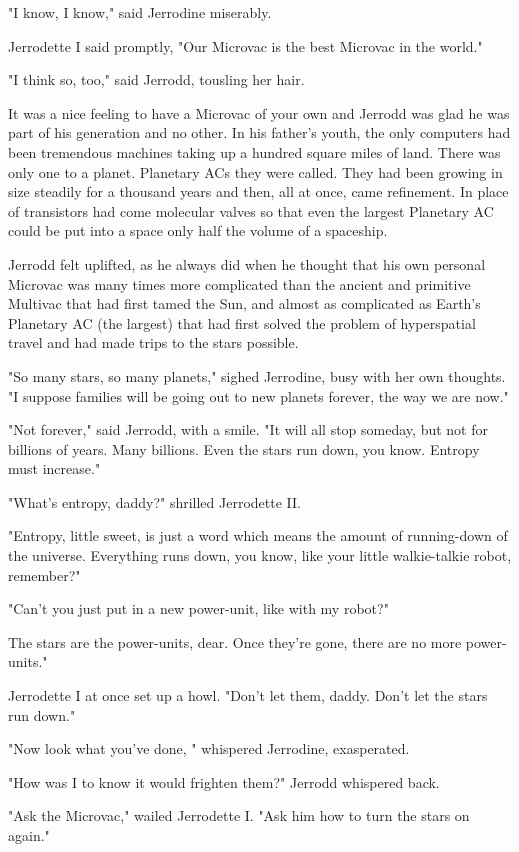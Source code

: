 \documentclass[11pt,twocolumn,paper=a5,pagesize]{article}
\begin{document}
{"I know, I know," said Jerrodine miserably.

Jerrodette I said promptly, "Our Microvac is the best Microvac in the world."

"I think so, too," said Jerrodd, tousling her hair.

It was a nice feeling to have a Microvac of your own and Jerrodd was glad he was part of his generation and no other. In his father's youth, the only computers had been tremendous machines taking up a hundred square miles of land. There was only one to a planet. Planetary ACs they were called. They had been growing in size steadily for a thousand years and then, all at once, came refinement. In place of transistors had come molecular valves so that even the largest Planetary AC could be put into a space only half the volume of a spaceship.

Jerrodd felt uplifted, as he always did when he thought that his own personal Microvac was many times more complicated than the ancient and primitive Multivac that had first tamed the Sun, and almost as complicated as Earth's Planetary AC (the largest) that had first solved the problem of hyperspatial travel and had made trips to the stars possible.

"So many stars, so many planets," sighed Jerrodine, busy with her own thoughts. "I suppose families will be going out to new planets forever, the way we are now."

"Not forever," said Jerrodd, with a smile. "It will all stop someday, but not for billions of years. Many billions. Even the stars run down, you know. Entropy must increase."

"What's entropy, daddy?" shrilled Jerrodette II.

"Entropy, little sweet, is just a word which means the amount of running-down of the universe. Everything runs down, you know, like your little walkie-talkie robot, remember?"

"Can't you just put in a new power-unit, like with my robot?"

The stars are the power-units, dear. Once they're gone, there are no more power-units."

Jerrodette I at once set up a howl. "Don't let them, daddy. Don't let the stars run down."

"Now look what you've done, " whispered Jerrodine, exasperated.

"How was I to know it would frighten them?" Jerrodd whispered back.

"Ask the Microvac," wailed Jerrodette I. "Ask him how to turn the stars on again."

}
\end{document}
